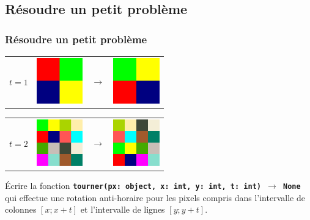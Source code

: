 \documentclass[svgnames,11pt]{beamer}
\begin{document}
\subsection{Résoudre un petit problème}
\begin{frame}
    \frametitle{Résoudre un petit problème}
    \begin{center}
        \begin{tabular}{cccc}
            {\Large $t=1$}
             &
            \includegraphics[width=2cm]{ressources/carre1.png}
             & $$\rightarrow$$
             &
            \includegraphics[width=2cm]{ressources/carre1-rot.png}
            \\
        \end{tabular}
    \end{center}
    \begin{center}
        \begin{tabular}{cccc}
            {\Large $t=2$}
             &
            \includegraphics[width=2cm]{ressources/carre2-int.png}
             & $$\rightarrow$$
             &
            \includegraphics[width=2cm]{ressources/carre2-rot.png}
            \\
        \end{tabular}
    \end{center}
    \begin{activite}
        Écrire la fonction \textbf{\texttt{tourner(px: object, x: int, y: int, t: int) $\rightarrow$ None}} qui effectue une rotation anti-horaire pour les pixels compris dans l'intervalle de colonnes $[x; x+t]$ et l'intervalle de lignes $[y; y+t]$.
    \end{activite}

\end{frame}
\end{document}
